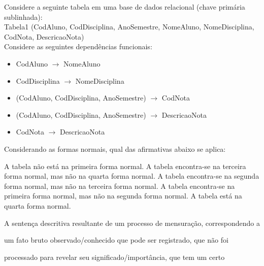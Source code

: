 \documentclass[12pt, addpoints]{exam}
\begin{document}
    \begin{questions}

    \newpage
    \question

Considere a seguinte tabela em uma base de dados relacional (chave primária sublinhada):\\

Tabela1 (CodAluno, CodDisciplina, AnoSemestre, NomeAluno, NomeDisciplina, CodNota, DescricaoNota)\\

Considere as seguintes dependências funcionais:

\begin{itemize}

    \item CodAluno \(\rightarrow\) NomeAluno

    \item CodDisciplina \(\rightarrow\) NomeDisciplina

    \item (CodAluno, CodDisciplina, AnoSemestre) \(\rightarrow\) CodNota

    \item (CodAluno, CodDisciplina, AnoSemestre) \(\rightarrow\) DescricaoNota

    \item CodNota \(\rightarrow\) DescricaoNota

\end{itemize}



Considerando as formas normais, qual das afirmativas abaixo se aplica:
\begin{choices}
\choice A tabela não está na primeira forma normal.
\choice A tabela encontra-se na terceira forma normal, mas não na quarta forma normal.
\choice A tabela encontra-se na segunda forma normal, mas não na terceira forma normal.
\choice A tabela encontra-se na primeira forma normal, mas não na segunda forma normal.
\choice A tabela está na quarta forma normal.
\end{choices}

\question

A sentença descritiva resultante de um processo de mensuração, correspondendo a

um fato bruto observado/conhecido que pode ser registrado, que não foi

processado para revelar seu significado/importância, que tem um certo


\end{questions}
\end{document}
